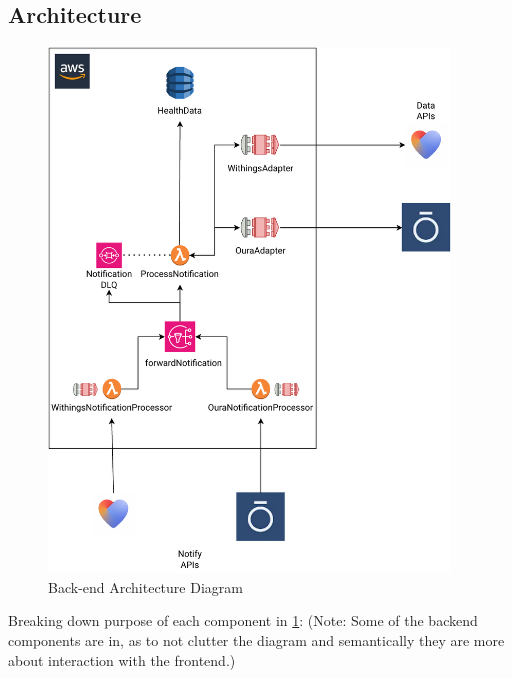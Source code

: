 \subsection{Architecture}
\begin{figure}
    
    \centering
    \includegraphics[width=0.95\textwidth,height=\textheight,keepaspectratio]{../images/backend.pdf}
    \caption{Back-end Architecture Diagram}
    \label{fig:backend}
    
\end{figure}
Breaking down purpose of each component in \ref{fig:backend}: (Note: Some of the backend components are in, as to not clutter the diagram and semantically they are more about interaction with the frontend.)
